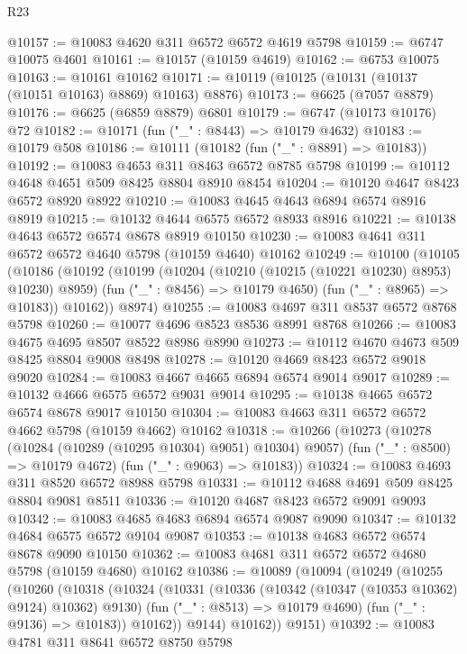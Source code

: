 \begin{lexlean}{R23}
\begin{coremodule}
@10157 := @10083 @4620 @311 @6572 @6572 @4619 @5798
@10159 := @6747 @10075 @4601
@10161 := @10157 (@10159 @4619)
@10162 := @6753 @10075
@10163 := @10161 @10162
@10171 := @10119 (@10125 (@10131 (@10137 (@10151 @10163) @8869) @10163) @8876)
@10173 := @6625 (@7057 @8879)
@10176 := @6625 (@6859 @8879) @6801
@10179 := @6747 (@10173 @10176) @72
@10182 := @10171 (fun ("_" : @8443) => @10179 @4632)
@10183 := @10179 @508
@10186 := @10111 (@10182 (fun ("_" : @8891) => @10183))
@10192 := @10083 @4653 @311 @8463 @6572 @8785 @5798
@10199 := @10112 @4648 @4651 @509 @8425 @8804 @8910 @8454
@10204 := @10120 @4647 @8423 @6572 @8920 @8922
@10210 := @10083 @4645 @4643 @6894 @6574 @8916 @8919
@10215 := @10132 @4644 @6575 @6572 @8933 @8916
@10221 := @10138 @4643 @6572 @6574 @8678 @8919 @10150
@10230 := @10083 @4641 @311 @6572 @6572 @4640 @5798 (@10159 @4640) @10162
@10249 := @10100
    (@10105
      (@10186
        (@10192
          (@10199
            (@10204 (@10210 (@10215 (@10221 @10230) @8953) @10230) @8959)
            (fun ("_" : @8456) => @10179 @4650)
            (fun ("_" : @8965) => @10183))
          @10162))
      @8974)
@10255 := @10083 @4697 @311 @8537 @6572 @8768 @5798
@10260 := @10077 @4696 @8523 @8536 @8991 @8768
@10266 := @10083 @4675 @4695 @8507 @8522 @8986 @8990
@10273 := @10112 @4670 @4673 @509 @8425 @8804 @9008 @8498
@10278 := @10120 @4669 @8423 @6572 @9018 @9020
@10284 := @10083 @4667 @4665 @6894 @6574 @9014 @9017
@10289 := @10132 @4666 @6575 @6572 @9031 @9014
@10295 := @10138 @4665 @6572 @6574 @8678 @9017 @10150
@10304 := @10083 @4663 @311 @6572 @6572 @4662 @5798 (@10159 @4662) @10162
@10318 := @10266
    (@10273
      (@10278 (@10284 (@10289 (@10295 @10304) @9051) @10304) @9057)
      (fun ("_" : @8500) => @10179 @4672)
      (fun ("_" : @9063) => @10183))
@10324 := @10083 @4693 @311 @8520 @6572 @8988 @5798
@10331 := @10112 @4688 @4691 @509 @8425 @8804 @9081 @8511
@10336 := @10120 @4687 @8423 @6572 @9091 @9093
@10342 := @10083 @4685 @4683 @6894 @6574 @9087 @9090
@10347 := @10132 @4684 @6575 @6572 @9104 @9087
@10353 := @10138 @4683 @6572 @6574 @8678 @9090 @10150
@10362 := @10083 @4681 @311 @6572 @6572 @4680 @5798 (@10159 @4680) @10162
@10386 := @10089
    (@10094
      (@10249
        (@10255
          (@10260
            (@10318
              (@10324
                (@10331
                  (@10336 (@10342 (@10347 (@10353 @10362) @9124) @10362) @9130)
                  (fun ("_" : @8513) => @10179 @4690)
                  (fun ("_" : @9136) => @10183))
                @10162))
            @9144)
          @10162))
      @9151)
@10392 := @10083 @4781 @311 @8641 @6572 @8750 @5798

\end{coremodule}
\end{lexlean}
